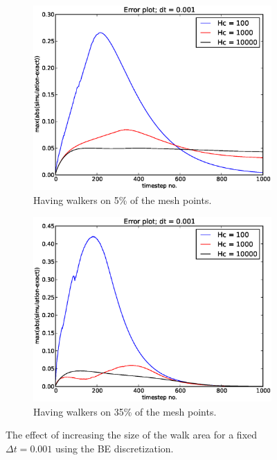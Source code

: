\begin{figure}[H]
\centering
\begin{subfigure}[b]{0.48\textwidth}
 \includegraphics[width=\textwidth]{../doc/results/experiment_19112013_1559/results/errorplot.eps}
 \caption{Having walkers on 5\% of the mesh points.}
 \label{errorplot_BE1D_walk_5_percent}
\end{subfigure}
\begin{subfigure}[b]{0.48\textwidth}
 \includegraphics[width=\textwidth]{../doc/results/experiment_19112013_1603/results/errorplot.eps}
 \caption{Having walkers on 35\% of the mesh points.}
 \label{errorplot_BE1D_walk_35_percent}
\end{subfigure}
\caption{The effect of increasing the size of the walk area for a fixed $\Delta t = 0.001$ using the BE discretization.}
\label{testing_walk_area_size_BE}
\end{figure}

